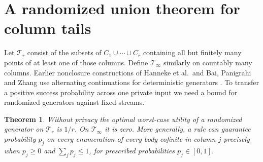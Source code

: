 \documentclass[11pt]{article}
\newtheorem{theorem}{Theorem}
\begin{document}
\section{A randomized union theorem for column tails}
Let $\mathcal T_r$ consist of the subsets of $C_1\cup\cdots\cup C_r$ containing all but finitely many points of at least one of those columns. Define $\mathcal T_\infty$ similarly on countably many columns. Earlier nonclosure constructions of Hanneke et al.\ and Bai, Panigrahi and Zhang use alternating continuations for deterministic generators \cite{hkmv,bpz}. To transfer a positive success probability across one private input we need a bound for randomized generators against fixed streams.
\begin{theorem}\label{union}
Without privacy the optimal worst-case utility of a randomized generator on $\mathcal T_r$ is $1/r$. On $\mathcal T_\infty$ it is zero. More generally, a rule can guarantee probability $p_j$ on every enumeration of every body cofinite in column $j$ precisely when $p_j\ge0$ and $\sum_j p_j\le1$, for prescribed probabilities $p_j\in[0,1]$.
\end{theorem}
\end{document}
